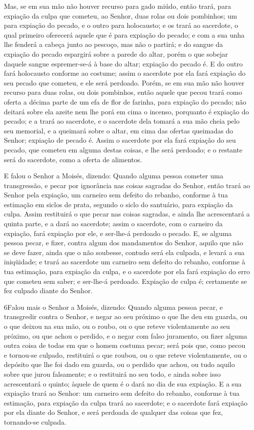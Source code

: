 Mas, se em sua mão não houver recurso para gado miúdo, então
trará, para expiação da culpa que cometeu, ao Senhor, duas rolas ou
dois pombinhos; um para expiação do pecado, e o outro para
holocausto; e os trará ao sacerdote, o qual primeiro oferecerá
aquele que é para expiação do pecado; e com a sua unha lhe fenderá a
cabeça junto ao pescoço, mas não o partirá; e do sangue da
expiação do pecado espargirá sobre a parede do altar, porém o que
sobejar daquele sangue espremer-se-á à base do altar; expiação do
pecado é. E do outro fará holocausto conforme ao costume;
assim o sacerdote por ela fará expiação do seu pecado que cometeu, e
ele será perdoado. Porém, se em sua mão não houver recurso
para duas rolas, ou dois pombinhos, então aquele que pecou trará
como oferta a décima parte de um efa de flor de farinha, para
expiação do pecado; não deitará sobre ela azeite nem lhe porá em
cima o incenso, porquanto é expiação do pecado; e a trará ao
sacerdote, e o sacerdote dela tomará a sua mão cheia pelo seu
memorial, e a queimará sobre o altar, em cima das ofertas queimadas
do Senhor; expiação de pecado é. Assim o sacerdote por ela
fará expiação do seu pecado, que cometeu em alguma destas coisas, e
lhe será perdoado; e o restante será do sacerdote, como a oferta de
alimentos.

E falou o Senhor a Moisés, dizendo: Quando alguma pessoa
cometer uma transgressão, e pecar por ignorância nas coisas sagradas
do Senhor, então trará ao Senhor pela expiação, um carneiro sem
defeito do rebanho, conforme à tua estimação em siclos de prata,
segundo o siclo do santuário, para expiação da culpa. Assim
restituirá o que pecar nas coisas sagradas, e ainda lhe acrescentará
a quinta parte, e a dará ao sacerdote; assim o sacerdote, com o
carneiro da expiação, fará expiação por ele, e ser-lhe-á perdoado o
pecado. E, se alguma pessoa pecar, e fizer, contra algum dos
mandamentos do Senhor, aquilo que não se deve fazer, ainda que o não
soubesse, contudo será ela culpada, e levará a sua iniqüidade;
e trará ao sacerdote um carneiro sem defeito do rebanho,
conforme à tua estimação, para expiação da culpa, e o sacerdote por
ela fará expiação do erro que cometeu sem saber; e ser-lhe-á
perdoado. Expiação de culpa é; certamente se fez culpado
diante do Senhor.


\medskip

\lettrine{6} Falou mais o Senhor a Moisés, dizendo: Quando
alguma pessoa pecar, e transgredir contra o Senhor, e negar ao seu
próximo o que lhe deu em guarda, ou o que deixou na sua mão, ou o
roubo, ou o que reteve violentamente ao seu próximo, ou que
achou o perdido, e o negar com falso juramento, ou fizer alguma
outra coisa de todas em que o homem costuma pecar; será pois
que, como pecou e tornou-se culpado, restituirá o que roubou, ou o
que reteve violentamente, ou o depósito que lhe foi dado em guarda,
ou o perdido que achou, ou tudo aquilo sobre que jurou
falsamente; e o restituirá no seu todo, e ainda sobre isso
acrescentará o quinto; àquele de quem é o dará no dia de sua
expiação. E a sua expiação trará ao Senhor: um carneiro sem
defeito do rebanho, conforme à tua estimação, para expiação da culpa
trará ao sacerdote; e o sacerdote fará expiação por ela diante
do Senhor, e será perdoada de qualquer das coisas que fez,
tornando-se culpada.

